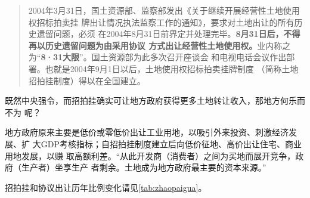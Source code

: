 \begin{quotation}
2004年3月31日，国土资源部、监察部发出《关于继续开展经营性土地使用权招标拍卖挂
牌出让情况执法监察工作的通知》，要求对土地出让的所有历史遗留问题，必须
在2004年8月31日前界定并处理完毕。\textbf{8月31日后，不得再以历史遗留问题为由采用协议
方式出让经营性土地使用权。}业内称之为“\textbf{8·31大限}”。国土资源部为此多次召开座谈会
和电视电话会议作出部署。也就是2004年9月1日以后，土地使用权招标拍卖挂牌制度
（简称土地招拍挂制度）得以在全国建立。
\end{quotation}

既然中央强令，而招拍挂确实可让地方政府获得更多土地转让收入，那地方何乐而不为
呢？

地方政府原来主要是低价或零低价出让工业用地，以吸引外来投资、刺激经济发展、扩
大GDP考核指标；自招拍挂制度建立后向低价征地、高价出让住宅、商业用地发展，以赚
取高额利差。“从此开发商（消费者）之间为买地而展开竞争，政府（生产者）坐享生产
者剩余。土地成为地方政府最主要的资本来源。”

招拍挂和协议出让历年比例变化请见\cref{tab:zhaopaigua}。
\begin{table}[]
\centering
{}
\caption{不同土地出让方式出让土地面积、收入的构成}
\label{tab:zhaopaigua}
\end{table}

